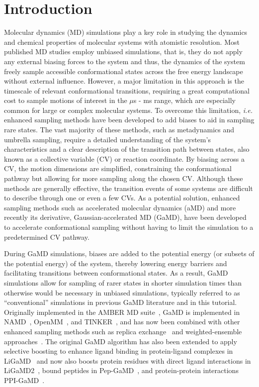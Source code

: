 \documentclass[9pt,tutorial]{livecoms}
\begin{document}
\section{Introduction}
Molecular dynamics (MD) simulations play a key role in studying the dynamics and chemical properties of molecular systems with atomistic resolution. Most published MD studies employ unbiased simulations, that is, they do not apply any external biasing forces to the system and thus, the dynamics of the system freely sample accessible conformational states across the free energy landscape without external influence. However, a major limitation in this approach is the timescale of relevant conformational transitions, requiring a great computational cost to sample motions of interest in the $\mu$s - ms range, which are especially common for large or complex molecular systems. To overcome this limitation, \textit{i.e.} enhanced sampling methods have been developed to add biases to aid in sampling rare states. The vast majority of these methods, such as metadynamics and umbrella sampling, require a detailed understanding of the system's characteristics and a clear description of the transition path between states, also known as a collective variable (CV) or reaction coordinate. By biasing across a CV, the motion dimensions are simplified, constraining the conformational pathway but allowing for more sampling along the chosen CV. Although these methods are generally effective, the transition events of some systems are difficult to describe through one or even a few CVs. As a potential solution, enhanced sampling methods such as accelerated molecular dynamics (aMD) and more recently its derivative, Gaussian-accelerated MD (GaMD), have been developed to accelerate conformational sampling without having to limit the simulation to a predetermined CV pathway.

During GaMD simulations, biases are added to the potential energy (or subsets of the potential energy) of the system, thereby lowering energy barriers and facilitating transitions between conformational states. As a result, GaMD simulations allow for sampling of rarer states in shorter simulation times than otherwise would be necessary in unbiased simulations, typically referred to as ``conventional'' simulations in previous GaMD literature and in this tutorial. Originally implemented in the AMBER MD suite~\cite{salomon-ferrer_overview_2013}, GaMD is implemented in NAMD~\cite{miao_gaussian_2015}, OpenMM~\cite{copeland_gaussian_2022}, and TINKER~\cite{celerse_efficient_2022}, and has now been combined with other enhanced sampling methods such as replica exchange~\cite{huang_replica_2018} and weighted-ensemble approaches~\cite{ahn_gaussian-accelerated_2021}. The original GaMD algorithm has also been extended to apply selective boosting to enhance ligand binding in protein-ligand complexes in LiGaMD~\cite{miao_ligand_2020} and now also boosts protein residues with direct ligand interactions in LiGaMD2~\cite{wang_ligand_2023},  bound peptides in Pep-GaMD~\cite{wang_peptide_2020}, and protein-protein interactions PPI-GaMD~\cite{wang_proteinprotein_2022}.
\end{document}
